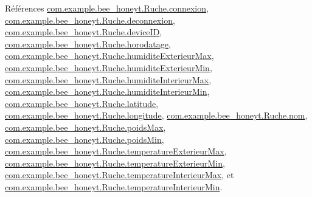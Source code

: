 Références \hyperlink{_ruche_8java_source_l00021}{com.\+example.\+bee\+\_\+honeyt.\+Ruche.\+connexion}, \hyperlink{_ruche_8java_source_l00022}{com.\+example.\+bee\+\_\+honeyt.\+Ruche.\+deconnexion}, \hyperlink{_ruche_8java_source_l00019}{com.\+example.\+bee\+\_\+honeyt.\+Ruche.\+device\+ID}, \hyperlink{_ruche_8java_source_l00020}{com.\+example.\+bee\+\_\+honeyt.\+Ruche.\+horodatage}, \hyperlink{_ruche_8java_source_l00032}{com.\+example.\+bee\+\_\+honeyt.\+Ruche.\+humidite\+Exterieur\+Max}, \hyperlink{_ruche_8java_source_l00031}{com.\+example.\+bee\+\_\+honeyt.\+Ruche.\+humidite\+Exterieur\+Min}, \hyperlink{_ruche_8java_source_l00030}{com.\+example.\+bee\+\_\+honeyt.\+Ruche.\+humidite\+Interieur\+Max}, \hyperlink{_ruche_8java_source_l00029}{com.\+example.\+bee\+\_\+honeyt.\+Ruche.\+humidite\+Interieur\+Min}, \hyperlink{_ruche_8java_source_l00036}{com.\+example.\+bee\+\_\+honeyt.\+Ruche.\+latitude}, \hyperlink{_ruche_8java_source_l00035}{com.\+example.\+bee\+\_\+honeyt.\+Ruche.\+longitude}, \hyperlink{_ruche_8java_source_l00018}{com.\+example.\+bee\+\_\+honeyt.\+Ruche.\+nom}, \hyperlink{_ruche_8java_source_l00034}{com.\+example.\+bee\+\_\+honeyt.\+Ruche.\+poids\+Max}, \hyperlink{_ruche_8java_source_l00033}{com.\+example.\+bee\+\_\+honeyt.\+Ruche.\+poids\+Min}, \hyperlink{_ruche_8java_source_l00028}{com.\+example.\+bee\+\_\+honeyt.\+Ruche.\+temperature\+Exterieur\+Max}, \hyperlink{_ruche_8java_source_l00027}{com.\+example.\+bee\+\_\+honeyt.\+Ruche.\+temperature\+Exterieur\+Min}, \hyperlink{_ruche_8java_source_l00026}{com.\+example.\+bee\+\_\+honeyt.\+Ruche.\+temperature\+Interieur\+Max}, et \hyperlink{_ruche_8java_source_l00025}{com.\+example.\+bee\+\_\+honeyt.\+Ruche.\+temperature\+Interieur\+Min}.


